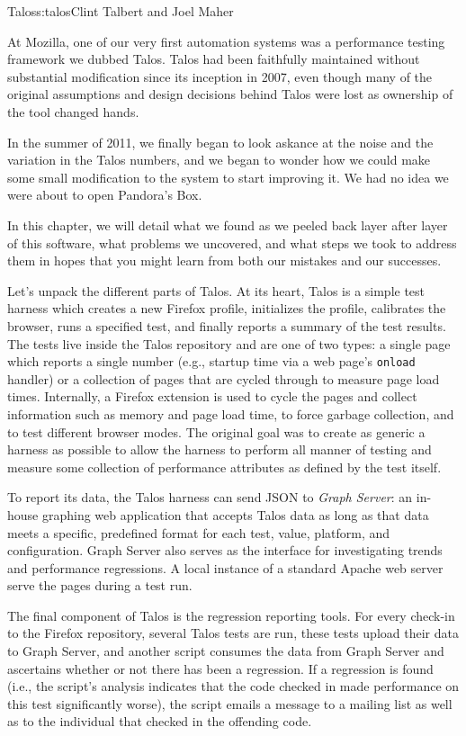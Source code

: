 \begin{aosachapter}{Talos}{s:talos}{Clint Talbert and Joel Maher}

At Mozilla, one of our very first automation systems was a performance
testing framework we dubbed Talos. Talos had been faithfully maintained
without substantial modification since its inception in 2007, even
though many of the original assumptions and design decisions behind
Talos were lost as ownership of the tool changed hands.

In the summer of 2011, we finally began to look askance at the noise and
the variation in the Talos numbers, and we began to wonder how we could
make some small modification to the system to start improving it. We had
no idea we were about to open Pandora's Box.

In this chapter, we will detail what we found as we peeled back layer
after layer of this software, what problems we uncovered, and what steps
we took to address them in hopes that you might learn from both our
mistakes and our successes.


Let's unpack the different parts of Talos. At its heart, Talos is a
simple test harness which creates a new Firefox profile, initializes the
profile, calibrates the browser, runs a specified test, and finally
reports a summary of the test results. The tests live inside the Talos
repository and are one of two types: a single page which reports a
single number (e.g., startup time via a web page's \texttt{onload}
handler) or a collection of pages that are cycled through to measure
page load times. Internally, a Firefox extension is used to cycle the
pages and collect information such as memory and page load time, to
force garbage collection, and to test different browser modes. The
original goal was to create as generic a harness as possible to allow
the harness to perform all manner of testing and measure some collection
of performance attributes as defined by the test itself.

To report its data, the Talos harness can send JSON to \emph{Graph
Server}: an in-house graphing web application that accepts Talos data as
long as that data meets a specific, predefined format for each test,
value, platform, and configuration. Graph Server also serves as the
interface for investigating trends and performance regressions. A local
instance of a standard Apache web server serve the pages during a test
run.

The final component of Talos is the regression reporting tools. For
every check-in to the Firefox repository, several Talos tests are run,
these tests upload their data to Graph Server, and another script
consumes the data from Graph Server and ascertains whether or not there
has been a regression. If a regression is found (i.e., the script's
analysis indicates that the code checked in made performance on this
test significantly worse), the script emails a message to a mailing list
as well as to the individual that checked in the offending code.


\end{aosachapter}
